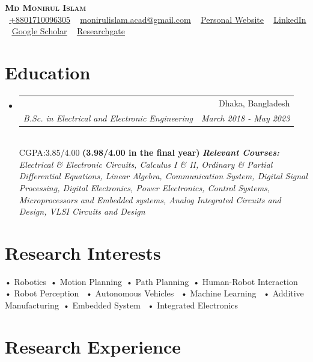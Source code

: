 \documentclass[a4paper,20pt]{article}
\makeatletter
\newcommand{\resumeSubheading}[4]{
  \vspace{-1pt}\item
    \begin{tabular*}{0.97\textwidth}{l@{\extracolsep{\fill}}r}
      \textbf{#1} & #2 \\
      \textit{#3} & \textit{#4} \\
    \end{tabular*}\vspace{-5pt}
}
\newcommand{\resumeSubHeadingListStart}{\begin{itemize}[leftmargin=*]}
\newcommand{\resumeSubHeadingListEnd}{\end{itemize}}
\makeatother
\begin{document}
\begin{center}
    {\Huge \scshape \textbf{Md Monirul Islam}} \\ \vspace{2pt}
    \small \raisebox{-0.1\height}\ 
    \href{tel:8801710096305}  {\underline{+8801710096305}}
    ~ \href{mailto:monirulislam.acad@gmail.com}{\underline{monirulislam.acad@gmail.com}}
    ~ \href{https://sites.google.com/view/md-monirul/home}{\underline{Personal Website}} 
    ~ \href{https://www.linkedin.com/in/monirul-islam-460001148/}{\underline{LinkedIn}} 
    ~ \href{https://scholar.google.com/citations?user=m-6T5FgAAAAJ&hl=en}{\underline{Google Scholar}}
    ~ \href{https://www.researchgate.net/profile/Monirul-Islam-40}{\underline{Researchgate}}
\end{center}
\section{\textbf{Education}}
  \resumeSubHeadingListStart
    \resumeSubheading
      {Bangladesh University of Engineering and Technology (BUET)

}{Dhaka, Bangladesh}
{B.Sc. in Electrical and Electronic Engineering  }{March 2018 - May 2023}{{}}\\ \vspace{2pt} {CGPA:3.85/4.00 \textbf{(3.98/4.00 in the final year)}}
      {\scriptsize \textit{ \footnotesize{\newline{}\textbf{Relevant Courses:}  Electrical \& Electronic Circuits, Calculus I \& II, Ordinary \& Partial Differential Equations, Linear Algebra, Communication System, Digital Signal Processing, Digital Electronics, Power Electronics, Control Systems, Microprocessors and Embedded systems, Analog Integrated Circuits and Design, VLSI Circuits and Design}}}
    \resumeSubHeadingListEnd
\section{\textbf{Research Interests}}
• Robotics~• Motion Planning~• Path Planning~• Human-Robot Interaction~ • Robot Perception~ • Autonomous Vehicles~ • Machine Learning~ • Additive Manufacturing~• Embedded System~ • Integrated Electronics~    

\vspace{2pt}
\section{\textbf{Research Experience}}
\end{document}
